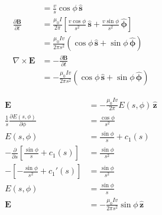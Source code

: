 \documentclass{article}
\renewcommand{\vec}[1]{\boldsymbol{\mathbf{#1}}}
\newcommand{\uvec}[1]{\hat{\vec{#1}}}
\begin{document}
\begin{align*}
                                      & = \frac{v}{s} \cos \phi \,\uvec{s}                                                                                             \\
  \frac{\partial \vec{B}}{\partial t} & = \frac{\mu_0 I}{2 \pi} \left[ \frac{v \cos \phi}{s^2} \,\uvec{s} + \frac{v \sin \phi}{s^2} \,\uvec{\phi} \right]              \\
                                      & = \frac{\mu_0 I v}{2 \pi s^2} (\cos \phi \,\uvec{s} + \sin \phi \,\uvec{\phi})                                                 \\
  \nabla \times \vec{E}               & = -\frac{\partial \vec{B}}{\partial t}                                                                                         \\
                                      & = -\frac{\mu_0 I v}{2 \pi s^2} (\cos \phi \,\uvec{s} + \sin \phi \,\uvec{\phi})
\end{align*}

\begin{align*}
  \vec{E}                                                                  & = -\frac{\mu_0 I v}{2 \pi} E(s, \phi) \,\uvec{z}    \\
  \frac{1}{s} \frac{\partial E(s, \phi)}{\partial \phi}                    & = \frac{\cos \phi}{s^2}                             \\
  E(s, \phi)                                                               & = \frac{\sin \phi}{s} + c_1(s)                      \\
  -\frac{\partial}{\partial s} \left[ \frac{\sin \phi}{s} + c_1(s) \right] & = \frac{\sin \phi}{s^2}                             \\
  -\left[ -\frac{\sin \phi}{s^2} + c_1'(s) \right]                         & = \frac{\sin \phi}{s^2}                             \\
  E(s, \phi)                                                               & = \frac{\sin \phi}{s}                               \\
  \vec{E}                                                                  & = -\frac{\mu_0 I v}{2 \pi s^2} \sin \phi \,\uvec{z}
\end{align*}

\subsection{}
\end{document}
